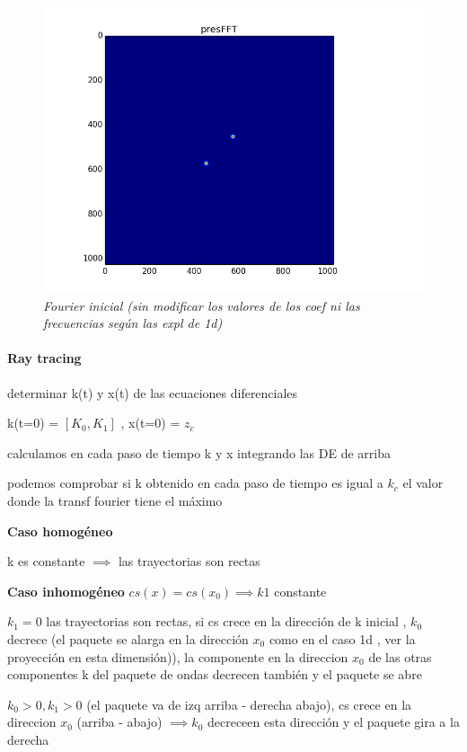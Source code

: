 \documentclass{article}
\begin{document}
\begin{figure}[!ht]
 \centering
 \includegraphics[scale=0.5]{fourier_ini.png}
 \caption{\emph{Fourier inicial (sin modificar los valores de los  coef ni las frecuencias según las expl de 1d)}}
\end{figure}


\paragraph{Ray tracing}
\begin{description}
\item determinar k(t) y x(t) de las ecuaciones diferenciales
\item k(t=0) =  $[K_0, K_1]$ , x(t=0) = $z_c$
\item calculamos en cada paso de tiempo k y x integrando las DE de arriba
\item podemos comprobar si k obtenido en cada paso de tiempo es igual a $k_c$ el valor donde la transf fourier tiene el máximo 


\item 
\item \textbf{Caso homogéneo}
\item k es constante $\implies$ las trayectorias son rectas

\item \textbf{Caso inhomogéneo} $cs(x) = cs(x_0) \implies k1 $ constante  
\begin{description}
\item $k_1 = 0$ las trayectorias son rectas, si cs crece en la dirección de k inicial , $k_0$ decrece (el paquete se alarga en la dirección $x_0$ como en el caso 1d , ver la proyección en esta dimensión)), 
la componente en la direccion $x_0$ de las otras
componentes  k del paquete de ondas decrecen también y el paquete se abre 
\item $k_0>0, k_1>0$ (el paquete va de izq arriba - derecha abajo), cs crece en la direccion $x_0$ (arriba - abajo)  $ \implies k_0$ decreceen esta dirección y el paquete gira a la derecha

\end{description}


\end{description}
\end{document}
